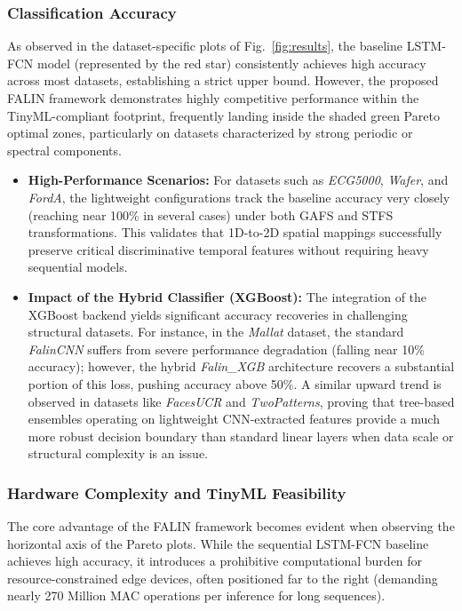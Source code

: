 \documentclass[10pt,conference]{IEEEtran}
\begin{document}
\subsubsection{Classification Accuracy}
As observed in the dataset-specific plots of Fig.~\ref{fig:results}, the baseline LSTM-FCN model (represented by the red star) consistently achieves high accuracy across most datasets, establishing a strict upper bound. However, the proposed FALIN framework demonstrates highly competitive performance within the TinyML-compliant footprint, frequently landing inside the shaded green Pareto optimal zones, particularly on datasets characterized by strong periodic or spectral components. 
\begin{itemize}
    \item \textbf{High-Performance Scenarios:} For datasets such as \textit{ECG5000}, \textit{Wafer}, and \textit{FordA}, the lightweight configurations track the baseline accuracy very closely (reaching near 100\% in several cases) under both GAFS and STFS transformations. This validates that 1D-to-2D spatial mappings successfully preserve critical discriminative temporal features without requiring heavy sequential models.
    \item \textbf{Impact of the Hybrid Classifier (XGBoost):} The integration of the XGBoost backend yields significant accuracy recoveries in challenging structural datasets. For instance, in the \textit{Mallat} dataset, the standard \textit{FalinCNN} suffers from severe performance degradation (falling near 10\% accuracy); however, the hybrid \textit{Falin\_XGB} architecture recovers a substantial portion of this loss, pushing accuracy above 50\%. A similar upward trend is observed in datasets like \textit{FacesUCR} and \textit{TwoPatterns}, proving that tree-based ensembles operating on lightweight CNN-extracted features provide a much more robust decision boundary than standard linear layers when data scale or structural complexity is an issue.
\end{itemize}

\subsubsection{Hardware Complexity and TinyML Feasibility}
The core advantage of the FALIN framework becomes evident when observing the horizontal axis of the Pareto plots. While the sequential LSTM-FCN baseline achieves high accuracy, it introduces a prohibitive computational burden for resource-constrained edge devices, often positioned far to the right (demanding nearly 270 Million MAC operations per inference for long sequences).
\end{document}
